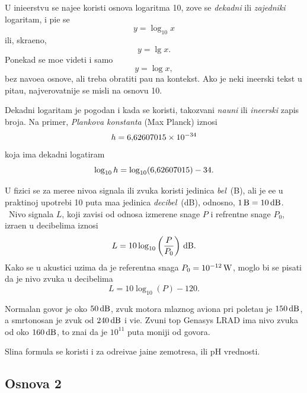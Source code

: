 \documentclass[12pt, twoside, a4paper]{article}
\def\logten{\log_{10}}
\def\puta{\times}
\def\.{\smash{,}\vphantom{.}}
\def\um#1{\,{\rm#1}}
\begin{document}
U ini{\zv}e{\nj}erstvu se naj{\cv}e{\sv}{\cc}e koristi osnova logaritma 10,
zove se {\sl dekadni\/} ili {\sl zajedni{\cv}ki\/} logaritam, i pi{\sv}e se
$$
y=\logten x
$$
ili, skra{\cc}eno,
$$
y=\lg x.
$$
Ponekad se mo{\zv}e videti i samo
$$
y=\log x,
$$
bez navo{\dj}e{\nj}a osnove, ali treba obratiti pa{\zv}{\nj}u na kontekst.
Ako je neki in{\zv}e{\nj}erski tekst u pita{\nj}u, najverovatnije se misli na osnovu 10.

Dekadni logaritam je pogodan i kada se koristi, takozvani {\sl nau{\cv}ni\/} ili {\sl in{\zv}e{\nj}erski\/}
zapis broja.
Na primer, {\sl Plankova konstanta\/} (Max Planck) iznosi
$$
h=6\.62607015\puta 10^{-34}
$$
koja ima dekadni logatiram
$$
\logten h=\logten(6\.62607015) - 34.
$$

U fizici se za mere{\nj}e nivoa signala ili zvuka koristi jedinica {\sl be\/l}~(B), ali je {\cv}e{\sv}{\cc}e
u prakti{\cv}noj upotrebi 10 puta ma{\nj}a jedinica {\sl decibel\/}~(dB), odnosno, $1\um{B}=10\um{dB}$. \
Nivo \hbox{sig\-na\-la} $L$, koji zavisi
od odnosa izmerene snage $P$ i refrentne snage $P_0$, izra{\zv}en u deci\-belima iznosi
$$
L=10\logten\left(\frac{P}{P_0}\right)\um{dB}.
$$
Kako se u akustici uzima da je referentna snaga $P_0=10^{-12}\um W$, moglo bi se pisati
da je nivo zvuka u decibelima
$$
L=10\logten(P)-120.
$$

Normalan govor je oko $50\um{dB}$, 
zvuk motora mlaznog aviona pri poleta{\nj}u je $150\um{dB}$, 
a smrtonosan je zvuk od $240\um{dB}$ i vi{\sv}e.
Zvu{\cv}ni top {\sf Genasys LRAD} ima nivo zvuka od oko $160\um{dB}$,
{\sv}to zna{\cv}i da je $10^{11}$ puta mo{\cc}niji od govora.

Sli{\cv}na formula se koristi i za odre{\dj}iva{\nj}e ja{\cv}ine zem{\lj}otresa, ili pH vrednosti.

\subsection{Osnova 2}

\def\lb{\mathop{\rm lb}}
\def\bits{{\it bits}}
\def\mant{{\it mantisa}}%
\def\expo{{\it eksponent}}%
\def\znak{{\it znak}}%
\end{document}
